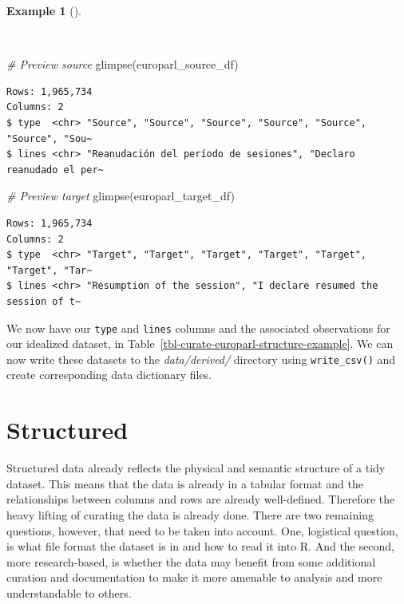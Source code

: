 \documentclass[
  letterpaper,
  krantz1]{latex/krantz-mod}
\newenvironment{Shaded}{\begin{snugshade}}{\end{snugshade}}
\newcommand{\CommentTok}[1]{\textcolor[rgb]{0.00,0.00,0.00}{\textit{#1}}}
\newcommand{\FunctionTok}[1]{\textcolor[rgb]{0.00,0.00,0.00}{#1}}
\newcommand{\NormalTok}[1]{\textcolor[rgb]{0.00,0.00,0.00}{#1}}
\theoremstyle{definition}
\newtheorem{example}{Example}[chapter]
\theoremstyle{definition}
\theoremstyle{remark}
\begin{document}
\begin{example}[]\protect\hypertarget{exm-curate-europarl-glimpse}{}\label{exm-curate-europarl-glimpse}

~

\begin{Shaded}
\begin{Highlighting}[numbers=left,,]
\CommentTok{\# Preview source}
\FunctionTok{glimpse}\NormalTok{(europarl\_source\_df)}
\end{Highlighting}
\end{Shaded}

\begin{verbatim}
Rows: 1,965,734
Columns: 2
$ type  <chr> "Source", "Source", "Source", "Source", "Source", "Source", "Sou~
$ lines <chr> "Reanudación del período de sesiones", "Declaro reanudado el per~
\end{verbatim}

\begin{Shaded}
\begin{Highlighting}[numbers=left,,]
\CommentTok{\# Preview target}
\FunctionTok{glimpse}\NormalTok{(europarl\_target\_df)}
\end{Highlighting}
\end{Shaded}

\begin{verbatim}
Rows: 1,965,734
Columns: 2
$ type  <chr> "Target", "Target", "Target", "Target", "Target", "Target", "Tar~
$ lines <chr> "Resumption of the session", "I declare resumed the session of t~
\end{verbatim}

\end{example}

We now have our \texttt{type} and \texttt{lines} columns and the
associated observations for our idealized dataset, in
Table~\ref{tbl-curate-europarl-structure-example}. We can now write
these datasets to the \emph{data/derived/} directory using
\texttt{write\_csv()} and create corresponding data dictionary files.

\section{Structured}\label{structured}

Structured data already reflects the physical and semantic structure of
a tidy dataset. This means that the data is already in a tabular format
and the relationships between columns and rows are already well-defined.
Therefore the heavy lifting of curating the data is already done. There
are two remaining questions, however, that need to be taken into
account. One, logistical question, is what file format the dataset is in
and how to read it into R. And the second, more research-based, is
whether the data may benefit from some additional curation and
documentation to make it more amenable to analysis and more
understandable to others.
\end{document}

